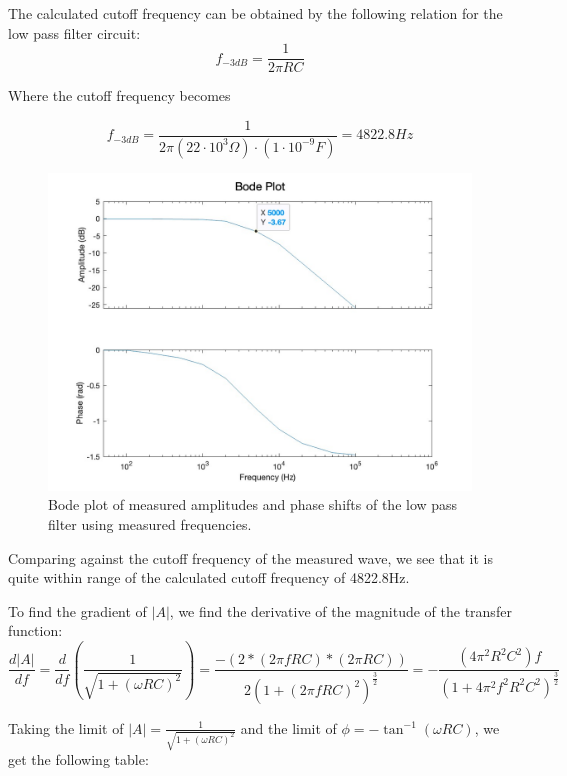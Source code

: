 The calculated cutoff frequency can be obtained by the following relation for the low pass filter circuit:
\begin{equation}
    f_{-3dB} = \frac{1}{2\pi RC}
\end{equation}

Where the cutoff frequency becomes

\begin{equation}
    f_{-3dB} = \frac{1}{2\pi (22\cdot 10^3\Omega)\cdot(1\cdot 10^{-9}{F})} = 4822.8{Hz}
\end{equation}

\begin{figure}[H]
    \centering
    \includegraphics[scale=0.3]{images/bode_plot_low_pass_measured_cutoff.jpg}
    \caption{Bode plot of measured amplitudes and phase shifts of the low pass filter using measured frequencies.}
\end{figure}
Comparing against the cutoff frequency of the measured wave, we see that it is quite within range of the calculated cutoff frequency of 4822.8{Hz}.

To find the gradient of $|A|$, we find the derivative of the magnitude of the transfer function:
\begin{equation}
    \frac{d|A|}{df} = \frac{d}{df}\left(\frac{1}{\sqrt{1+(\omega RC)^2}}\right) = \frac{-(2*(2\pi fRC) * (2\pi RC))}{2(1+(2\pi fRC)^2)^{\frac{3}{2}}} = -\frac{(4\pi^2R^2C^2)f}{(1+4\pi^2f^2R^2C^2)^{\frac{3}{2}}}
\end{equation}

Taking the limit of $|A| = \frac{1}{\sqrt{1+(\omega RC)^2}}$ and the limit of $\phi = -\tan^{-1}(\omega RC)$, we get the following table:

